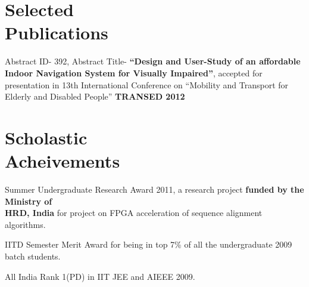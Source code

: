 \documentclass[margin,line]{resume}
\begin{document}
\begin{resume}
\begin{tabular}{c c c c}
    \end{tabular}	\vspace{1mm}
    
%       

    \section{\mysidestyle  Selected\\Publications}
    Abstract ID- 392, Abstract Title- \textbf{``Design and User-Study of an affordable Indoor Navigation System for Visually Impaired''}, accepted for presentation in 13th International Conference on ``Mobility and Transport for Elderly and Disabled People'' \textbf{TRANSED 2012}
    \section{\mysidestyle Scholastic \\Acheivements} 
    \begin{list2} 
	\setlength{\itemindent}{-0.63em} 
	\item Summer Undergraduate Research Award 2011, a research project \textbf{funded by the Ministry of \\
\hspace*{-3.5mm} HRD, India} for project on FPGA acceleration of sequence alignment algorithms.%
	\item IITD Semester Merit Award for being in top 7\% of all the undergraduate 2009 batch students.%
	\item All India Rank 1(PD) in IIT JEE and AIEEE 2009.
    \end{list2}		\vspace{2mm}

\end{resume}
\end{document}
